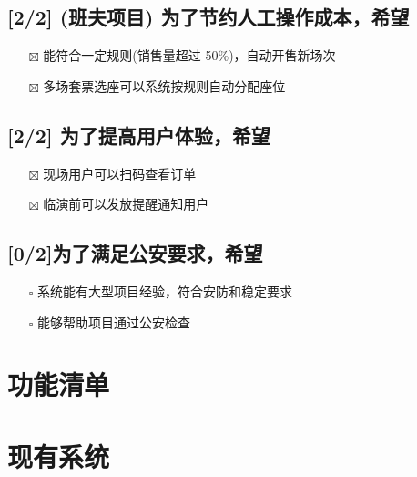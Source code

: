 \documentclass[11pt,a4paper]{article}
\begin{document}
\subsection*{[2/2] (班夫项目) 为了节约人工操作成本，希望}
\label{sec:org8d9512e}
\begin{itemize}
\item[{$\boxtimes$}] 能符合一定规则(销售量超过 50\%)，自动开售新场次
\item[{$\boxtimes$}] 多场套票选座可以系统按规则自动分配座位
\end{itemize}
\subsection*{[2/2] 为了提高用户体验，希望}
\label{sec:orgc97fa36}
\begin{itemize}
\item[{$\boxtimes$}] 现场用户可以扫码查看订单
\item[{$\boxtimes$}] 临演前可以发放提醒通知用户
\end{itemize}
\subsection*{[0/2]为了满足公安要求，希望}
\label{sec:orgfcbb1eb}
\begin{itemize}
\item[{$\square$}] 系统能有大型项目经验，符合安防和稳定要求
\item[{$\square$}] 能够帮助项目通过公安检查
\end{itemize}


\section*{功能清单}
\label{sec:org59f5ae8}


\section*{现有系统}
\label{sec:org7d4f21a}
\end{document}
